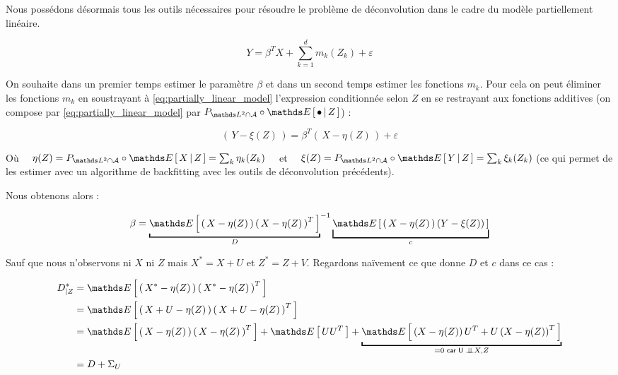 Nous possédons désormais tous les outils nécessaires pour résoudre le problème de déconvolution dans le cadre du modèle partiellement linéaire. 

\begin{equation}
    Y = \beta^T X + \sum_{k=1}^d m_k(Z_k) + \varepsilon\label{eq:partially_linear_model}
\end{equation}

On souhaite dans un premier temps estimer le paramètre $\beta$ et dans un second temps estimer les fonctions $m_k$. Pour cela on peut éliminer les fonctions $m_k$ en soustrayant à \eqref{eq:partially_linear_model} l'expression conditionnée selon $Z$ en se restrayant aux fonctions additives (on compose par \eqref{eq:partially_linear_model} par $P_{\mathds L^2 \cap \mathcal A} \circ \esperancesachant Z { \bullet }$) :

\begin{equation}
    \left( \, Y - \xi(Z) \, \right) = \beta^T \left( \, X - \eta(Z) \, \right) + \varepsilon
\end{equation}

\noindent Où $\quad\eta(Z) = P_{\mathds L^2 \cap \mathcal A} \circ \esperancesachant Z { X } = \sum_k \eta_k(Z_k)\quad$ et $\quad\xi(Z) = P_{\mathds L^2 \cap \mathcal A} \circ \esperancesachant Z { Y } = \sum_k \xi_k(Z_k)$ (ce qui permet de les estimer avec un algorithme de backfitting avec les outils de déconvolution précédents).

\noindent Nous obtenons alors :

\begin{equation}
    \beta = 
    {
        \underbracket
        {\esperance{ \left( \, X - \eta(Z) \, \right) \left( \, X - \eta(Z) \, \right)^T }} 
        _{D}
    }^{-1}
    \underbracket[1pt][2.75mm]
    {\esperance{ \left( \, X - \eta(Z) \, \right)  (Y - \xi(Z))}}
    _{c}\label{eq:beta}
\end{equation}

\noindent Sauf que nous n'observons ni $X$ ni $Z$ mais $X^* = X+U$ et $Z^* = Z+V$. Regardons naïvement ce que donne $D$ et $c$ dans ce cas :

\begin{align}
    D^*_{| Z} &= \esperance{ \left( \, X^* - \eta(Z) \, \right) \left( \, X^* - \eta(Z) \, \right)^T } \\
        &= \esperance{ \left( \, X + U - \eta(Z) \, \right) \left( \, X + U - \eta(Z) \, \right)^T } \\
        &= \esperance{ \left( \, X - \eta(Z) \, \right) \left( \, X - \eta(Z) \, \right)^T } + \esperance{ U U^T } + \underbracket{\esperance{ \left( X - \eta(Z) \right)U^T + U\left( X - \eta(Z) \right)^T }}_{= 0 \textsf{ car U } \indep X,Z}\\
        &= D + \Sigma_U 
\end{align}

